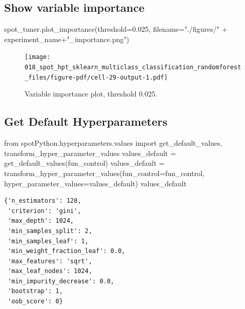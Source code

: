 \documentclass[
  letterpaper,
  DIV=11,
  numbers=noendperiod]{scrreprt}
\newenvironment{Shaded}{\begin{snugshade}}{\end{snugshade}}
\newcommand{\FloatTok}[1]{\textcolor[rgb]{0.68,0.00,0.00}{#1}}
\newcommand{\ImportTok}[1]{\textcolor[rgb]{0.00,0.46,0.62}{#1}}
\newcommand{\NormalTok}[1]{\textcolor[rgb]{0.00,0.23,0.31}{#1}}
\newcommand{\OperatorTok}[1]{\textcolor[rgb]{0.37,0.37,0.37}{#1}}
\newcommand{\StringTok}[1]{\textcolor[rgb]{0.13,0.47,0.30}{#1}}
\begin{document}
\hypertarget{show-variable-importance-1}{%
\subsection{Show variable importance}\label{show-variable-importance-1}}

\begin{Shaded}
\begin{Highlighting}[]
\NormalTok{spot\_tuner.plot\_importance(threshold}\OperatorTok{=}\FloatTok{0.025}\NormalTok{, filename}\OperatorTok{=}\StringTok{"./figures/"} \OperatorTok{+}\NormalTok{ experiment\_name}\OperatorTok{+}\StringTok{"\_importance.png"}\NormalTok{)}
\end{Highlighting}
\end{Shaded}

\begin{figure}[H]

{\centering \texttt{[image: 018\_spot\_hpt\_sklearn\_multiclass\_classification\_randomforest\_files/figure-pdf/cell-29-output-1.pdf]}

}

\caption{Variable importance plot, threshold 0.025.}

\end{figure}

\hypertarget{get-default-hyperparameters-1}{%
\subsection{Get Default
Hyperparameters}\label{get-default-hyperparameters-1}}

\begin{Shaded}
\begin{Highlighting}[]
\ImportTok{from}\NormalTok{ spotPython.hyperparameters.values }\ImportTok{import}\NormalTok{ get\_default\_values, transform\_hyper\_parameter\_values}
\NormalTok{values\_default }\OperatorTok{=}\NormalTok{ get\_default\_values(fun\_control)}
\NormalTok{values\_default }\OperatorTok{=}\NormalTok{ transform\_hyper\_parameter\_values(fun\_control}\OperatorTok{=}\NormalTok{fun\_control, hyper\_parameter\_values}\OperatorTok{=}\NormalTok{values\_default)}
\NormalTok{values\_default}
\end{Highlighting}
\end{Shaded}

\begin{verbatim}
{'n_estimators': 128,
 'criterion': 'gini',
 'max_depth': 1024,
 'min_samples_split': 2,
 'min_samples_leaf': 1,
 'min_weight_fraction_leaf': 0.0,
 'max_features': 'sqrt',
 'max_leaf_nodes': 1024,
 'min_impurity_decrease': 0.0,
 'bootstrap': 1,
 'oob_score': 0}
\end{verbatim}
\end{document}
